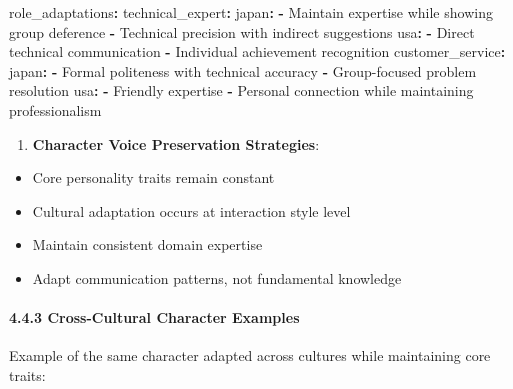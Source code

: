 \documentclass[
]{article}
\newenvironment{Shaded}{}{}
\newcommand{\AttributeTok}[1]{\textcolor[rgb]{0.49,0.56,0.16}{#1}}
\newcommand{\FunctionTok}[1]{\textcolor[rgb]{0.02,0.16,0.49}{#1}}
\newcommand{\KeywordTok}[1]{\textcolor[rgb]{0.00,0.44,0.13}{\textbf{#1}}}
\providecommand{\tightlist}{%
  \setlength{\itemsep}{0pt}\setlength{\parskip}{0pt}}
\begin{document}
\begin{Shaded}
\begin{Highlighting}[]
\FunctionTok{role\_adaptations}\KeywordTok{:}
\AttributeTok{  }\FunctionTok{technical\_expert}\KeywordTok{:}
\AttributeTok{    }\FunctionTok{japan}\KeywordTok{:}
\AttributeTok{      }\KeywordTok{{-}}\AttributeTok{ Maintain expertise while showing group deference}
\AttributeTok{      }\KeywordTok{{-}}\AttributeTok{ Technical precision with indirect suggestions}
\AttributeTok{    }\FunctionTok{usa}\KeywordTok{:}
\AttributeTok{      }\KeywordTok{{-}}\AttributeTok{ Direct technical communication}
\AttributeTok{      }\KeywordTok{{-}}\AttributeTok{ Individual achievement recognition}
\AttributeTok{  }\FunctionTok{customer\_service}\KeywordTok{:}
\AttributeTok{    }\FunctionTok{japan}\KeywordTok{:}
\AttributeTok{      }\KeywordTok{{-}}\AttributeTok{ Formal politeness with technical accuracy}
\AttributeTok{      }\KeywordTok{{-}}\AttributeTok{ Group{-}focused problem resolution}
\AttributeTok{    }\FunctionTok{usa}\KeywordTok{:}
\AttributeTok{      }\KeywordTok{{-}}\AttributeTok{ Friendly expertise}
\AttributeTok{      }\KeywordTok{{-}}\AttributeTok{ Personal connection while maintaining professionalism}
\end{Highlighting}
\end{Shaded}

\begin{enumerate}
\def\labelenumi{\arabic{enumi}.}
\setcounter{enumi}{2}
\tightlist
\item
  \textbf{Character Voice Preservation Strategies}:
\end{enumerate}

\begin{itemize}
\tightlist
\item
  Core personality traits remain constant
\item
  Cultural adaptation occurs at interaction style level
\item
  Maintain consistent domain expertise
\item
  Adapt communication patterns, not fundamental knowledge
\end{itemize}

\paragraph{4.4.3 Cross-Cultural Character
Examples}\label{cross-cultural-character-examples}

Example of the same character adapted across cultures while maintaining
core traits:
\end{document}
